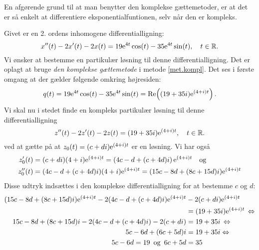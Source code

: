 \begin{aha}
En afgørende grund til at man benytter den komplekse gættemetoder, er at det er så enkelt at differentiere eksponentialfuntionen, selv når den er kompleks.
\end{aha}

\begin{example}\label{complexGuess}
Givet er en 2. ordens inhomogene differentialligning:
\begin{equation}
x''(t) - 2x'(t) - 2x(t) = 19\mathrm{e}^{4t}\cos(t)-35\mathrm{e}^{4t}\sin(t), \quad t \in \mathbb{R}. \label{lig.ekskompl}
\end{equation}
Vi ønsker at bestemme en partikulær løsning til denne differentialligning. Det er oplagt at bruge \textit{den komplekse gættemetode} i metode \ref{met.kompl}. Det ses i første omgang at der gælder følgende omkring højresiden:
\begin{equation}
q(t) = 19\mathrm{e}^{4t}\cos(t)-35\mathrm{e}^{4t}\sin(t) = \mathrm{Re} \! \left( (19+35i)\mathrm{e}^{(4+i)t} \right).
\end{equation}
Vi skal nu i stedet finde en kompleks partikulær løsning til denne differentialligning
\begin{equation}
z''(t) - 2z'(t) - 2z(t) = (19+35i)\mathrm{e}^{(4+i)t}, \quad t \in \mathbb{R}.
\end{equation}
ved at gætte på at $ z_{0}(t) = (c+di)\mathrm{e}^{(4+i)t} $ er en løsning. Vi har også
\begin{equation}
\begin{aligned}
z_{0}'(t) &= (c+di)(4+i)\mathrm{e}^{(4+i)t} = \left(4c-d+(c+4d)i\right)\mathrm{e}^{(4+i)t} \quad \mathrm{og}\\
z_{0}''(t) &= (4c-d+(c+4d)i)(4+i)\mathrm{e}^{(4+i)t} = (15c-8d + (8c+15d)i)\mathrm{e}^{(4+i)t}
\end{aligned}
\end{equation}
Disse udtryk indsættes i den komplekse differentialligning for at bestemme $ c $ og $ d $:
\begin{equation}
\begin{aligned}
(15c-8d + (8c+15d)i)\mathrm{e}^{(4+i)t} - 2(4c-d+(c+4d)i)\mathrm{e}^{(4+i)t}& - 2(c+di)\mathrm{e}^{(4+i)t} \\
&= (19+35i)\mathrm{e}^{(4+i)t} \, \Leftrightarrow \\
15c-8d + (8c+15d)i - 2(4c-d+(c+4d)i) - 2(c+di) &= 19+35i \, \Leftrightarrow \\
5c-6d + (6c+5d)i &= 19 + 35i \Leftrightarrow \\
5c-6d = 19 \,\,\,\mathrm{og} \,\,\, 6c+5d &= 35
\end{aligned}
\end{equation}

\end{example}
